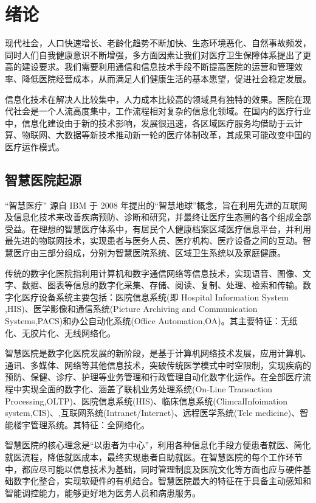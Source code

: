 \documentclass[doctor,secret]{thuthesis}
\begin{document}

\mainmatter
\chapter{绪论}
\label{sec:org58076a0}
现代社会，人口快速增长、老龄化趋势不断加快、生态环境恶化、自然事故频发，同时人们自我健康意识不断增强，多方面因素让我们对医疗卫生保障体系提出了更高的建设要求。我们需要利用通信和信息技术手段不断提高医院的运营和管理效率、降低医院经营成本，从而满足人们健康生活的基本愿望，促进社会稳定发展。

信息化技术在解决人比较集中，人力成本比较高的领域具有独特的效果。医院在现代社会是一个人流高度集中，工作流程相对复杂的信息化领域。在国内的医疗行业中，信息化建设由于新的技术影响，发展很迅速，各区域医疗服务均借助于云计算、物联网、大数据等新技术推动新一轮的医疗体制改革，其成果可能改变中国的医疗运作模式。
\section{智慧医院起源}
\label{sec:org2551bc6}
“智慧医疗” \cite{__2012,__2016-4,__2013-2} 源自 IBM 于 2008 年提出的“智慧地球”概念，旨在利用先进的互联网及信息化技术来改善疾病预防、诊断和研究，并最终让医疗生态圈的各个组成全部受益。在理想的智慧医疗体系中，有居民个人健康档案区域医疗信息平台，并利用最先进的物联网技术，实现患者与医务人员、医疗机构、医疗设备之间的互动。智慧医疗由三部分组成，分别为智慧医院系统、区域卫生系统以及家庭健康。

传统的数字化医院指利用计算机和数字通信网络等信息技术，实现语音、图像、文字、数据、图表等信息的数字化采集、存储、阅读、复制、处理、检索和传输。数字化医疗设备系统主要包括：医院信息系统(即 Hospital Information System ,HIS)、医学影像和通信系统(Picture Archiving and Communication Systems,PACS)和办公自动化系统(Office Automation,OA)。其主要特征：无纸化、无胶片化、无线网络化。

智慧医院是数字化医院发展的新阶段，是基于计算机网络技术发展，应用计算机、通讯、多媒体、网络等其他信息技术，突破传统医学模式中时空限制，实现疾病的预防、保健、诊疗、护理等业务管理和行政管理自动化数字化运作。在全部医疗流程中实现全面的数字化、涵盖了联机业务处理系统(On-Line Transaction Processing,OLTP)、医院信息系统(HIS)、临床信息系统(ClimcalInfoimation system,CIS)、,互联网系统(Intranet/Internet)、远程医学系统(Tele medicine)、智能楼宇管理系统。其特征：全网络化。

智慧医院的核心理念是“以患者为中心”，利用各种信息化手段方便患者就医、简化就医流程，降低就医成本，最终实现患者自助就医。在智慧医院的每个工作环节中，都应尽可能以信息技术为基础，同时管理制度及医院文化等方面也应与硬件基础数字化整合，实现软硬件的有机结合。智慧医院最大的特征在于具备主动感知和智能调控能力，能够更好地为医务人员和病患服务。
\end{document}

